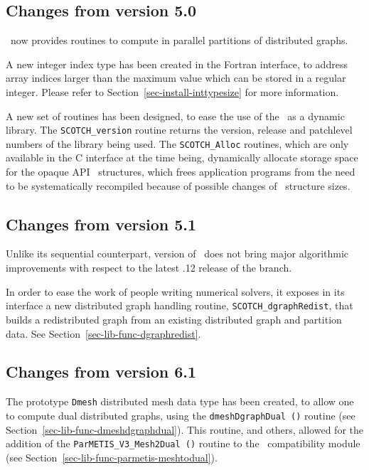 \subsection{Changes from version 5.0}

\ptscotch\ now provides routines to compute in
parallel partitions of distributed graphs.

A new integer index type has been created in the Fortran interface, to
address array indices larger than the maximum value which can be
stored in a regular integer. Please refer to
Section~\ref{sec-install-inttypesize} for more information.

A new set of routines has been designed, to ease the use of the
\libscotch\ as a dynamic library. The {\tt SCOTCH\_\lbt version}
routine returns the version, release and patchlevel numbers of the
library being used. The {\tt SCOTCH\_\lbt *Alloc} routines,
which are only available in the C interface at the time being,
dynamically allocate storage space for the opaque API
\scotch\ structures, which frees application programs from the need
to be systematically recompiled because of possible changes of
\scotch\ structure sizes.

\subsection{Changes from version 5.1}

Unlike its sequential counterpart, version {} of
\ptscotch\ does not bring major algorithmic improvements with respect
to the latest {.12} release of the {} branch.

In order to ease the work of people writing numerical solvers, it
exposes in its interface a new distributed graph handling routine,
{\tt SCOTCH\_\lbt dgraph\lbt Redist}, that builds a redistributed
graph from an existing distributed graph and partition data. See
Section~\ref{sec-lib-func-dgraphredist}.

\subsection{Changes from version 6.1}

The prototype \texttt{Dmesh} distributed mesh data type has been
created, to allow one to compute dual distributed graphs, using
the \texttt{dmeshDgraphDual\,()} routine (see
Section~\ref{sec-lib-func-dmeshdgraphdual}). This routine, and others,
allowed for the addition of the
\texttt{ParMETIS\_\lbt V3\_\lbt Mesh2Dual\,()} routine to the
\parmetis\ compatibility module (see
Section~\ref{sec-lib-func-parmetis-meshtodual}).
